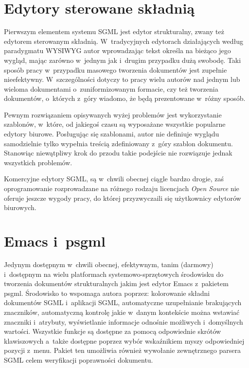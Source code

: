 \documentclass[brudnopis]{xmgr}
\begin{document}
\section{Edytory sterowane składnią\label{s:edytor}}

Pierwszym elementem systemu SGML jest edytor
strukturalny, zwany też edytorem sterowanym
składnią. W~tradycyjnych edytorach działających według paradygmatu
WYSIWYG autor wprowadzając tekst określa na bieżąco
jego wygląd, mając zarówno w~jednym jak i~drugim przypadku dużą
swobodę.  Taki sposób pracy w~przypadku masowego tworzenia dokumentów
jest zupełnie nieefektywny. W~szczególności dotyczy to pracy wielu
autorów nad jednym lub wieloma dokumentami o~zuniformizowanym
formacie, czy też tworzenia dokumentów, o~których z~góry wiadomo, że
będą prezentowane w~różny sposób.

Pewnym rozwiązaniem opisywanych wyżej problemów jest wykorzystanie
szablonów, w~które, od jakiegoś czasu są wyposażane wszystkie
popularne edytory biurowe.  Posługując się
szablonami, autor nie definiuje wyglądu samodzielnie tylko wypełnia
treścią zdefiniowany z~góry szablon dokumentu.
Stanowiąc niewątpliwy
krok do przodu takie podejście nie rozwiązuje jednak wszystkich
problemów.

Komercyjne edytory SGML, są w~chwili obecnej ciągle bardzo
drogie, zaś oprogramowanie rozprowadzane na różnego rodzaju licencjach
\emph{Open Source\/} nie oferuje jeszcze wygody pracy, do której
przyzwyczaili się użytkownicy edytorów biurowych.

\section{Emacs i~psgml}

Jedynym dostępnym w~chwili
obecnej, efektywnym, tanim (darmowy) i~dostępnym na wielu
platformach systemowo-sprzętowych środowisku do tworzenia dokumentów
strukturalnych jakim jest edytor Emacs z~pakietem
psgml. Środowisko to wspomaga autora poprzez:
kolorowanie składni dokumentów SGML i~aplikacji SGML, automatyczne
uzupełnianie brakujących znaczników, automatyczną kontrolę jakie
w~danym kontekście można wstawiać znaczniki i~atrybuty, wyświetlanie
informacje odnośnie możliwych i~domyślnych wartości.
Wszystkie funkcje są dostępne za pomocą
odpowiednie skrótów klawiszowych a~także dostępne poprzez wybór
wskaźnikiem myszy odpowiedniej pozycji z~menu. Pakiet ten umożliwia
również wywołanie zewnętrznego parsera SGML celem
weryfikacji poprawności dokumentu.
\end{document}
